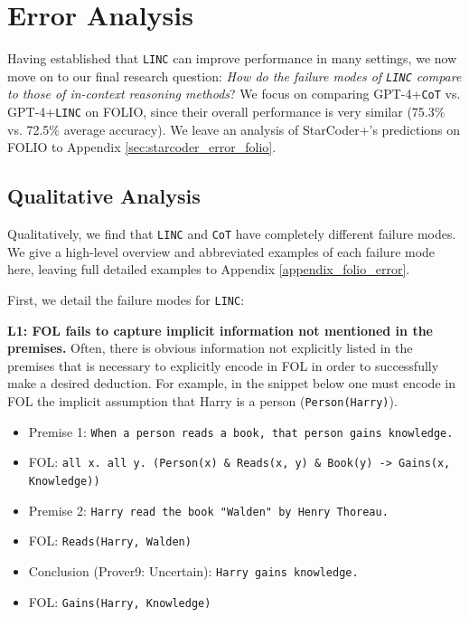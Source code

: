 \documentclass[11pt]{article}
\begin{document}
\section{Error Analysis}
\label{sec:error_analysis}
Having established that \texttt{LINC} can improve performance in many settings, we now move on to our final research question:
\textit{How do the failure modes of \texttt{LINC} compare to those of in-context reasoning methods}?
We focus on comparing GPT-4+\texttt{CoT} vs. GPT-4+\texttt{LINC} on FOLIO, since their overall performance is very similar (75.3\% vs. 72.5\% average accuracy). We leave an analysis of StarCoder+'s predictions on FOLIO to Appendix \ref{sec:starcoder_error_folio}.

\subsection{Qualitative Analysis} \label{sec:error_qualitative}
Qualitatively, we find that \texttt{LINC} and \texttt{CoT} have completely different failure modes. We give a high-level overview and abbreviated examples of each failure mode here, leaving full detailed examples to Appendix \ref{appendix_folio_error}.

First, we detail the failure modes for \texttt{LINC}:

\textbf{L1: FOL fails to capture implicit information not mentioned in the premises.} Often, there is obvious information not explicitly listed in the premises that is necessary to explicitly encode in FOL in order to successfully make a desired deduction. For example, in the snippet below one must encode in FOL the implicit assumption that Harry is a person (\texttt{Person(Harry)}).

\begin{itemize}[leftmargin=*]
\itemsep0.1em
    \item[] \small Premise 1: \texttt{When a person reads a book, that person gains knowledge.}
    \item[] \small FOL: \texttt{all x. all y. (Person(x) \& Reads(x, y) \& Book(y) -> Gains(x, Knowledge))}
    \item[] \small Premise 2: \texttt{Harry read the book "Walden" by Henry Thoreau.}
    \item[] \small FOL: \texttt{Reads(Harry, Walden)}
    \item[] \small Conclusion (Prover9: Uncertain): \texttt{Harry gains knowledge.}
    \item[] \small FOL: \texttt{Gains(Harry, Knowledge)}
\end{itemize}
\end{document}
